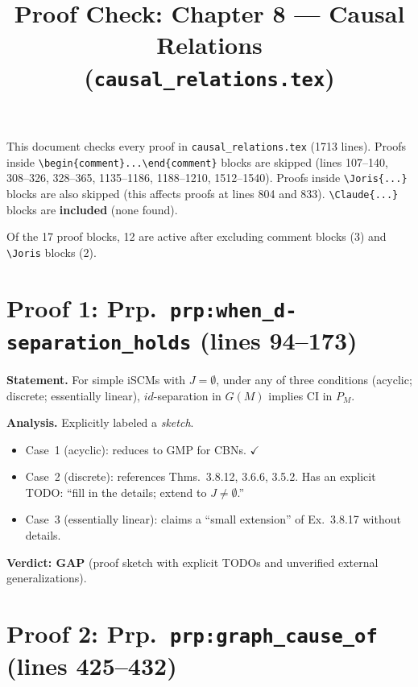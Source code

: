 \documentclass{article}
\title{Proof Check: Chapter 8 --- Causal Relations\\(\texttt{causal\_relations.tex})}
\date{}
\begin{document}
\maketitle

This document checks every proof in \texttt{causal\_relations.tex} (1713 lines).
Proofs inside \verb|\begin{comment}...\end{comment}| blocks are skipped
(lines 107--140, 308--326, 328--365, 1135--1186, 1188--1210, 1512--1540).
Proofs inside \verb|\Joris{...}| blocks are also skipped (this affects
proofs at lines 804 and 833).
\verb|\Claude{...}| blocks are \textbf{included} (none found).

Of the 17 proof blocks, 12 are active after excluding comment blocks (3)
and \verb|\Joris| blocks (2).

\section{Proof 1: Prp.\ \texttt{prp:when\_d-separation\_holds} (lines 94--173)}

\textbf{Statement.} For simple iSCMs with $J=\emptyset$, under any of three
conditions (acyclic; discrete; essentially linear), $id$-separation in $G(M)$
implies CI in $P_M$.

\textbf{Analysis.}
Explicitly labeled a \emph{sketch}.
\begin{itemize}
  \item Case~1 (acyclic): reduces to GMP for CBNs.  $\checkmark$
  \item Case~2 (discrete): references \cite{FM17} Thms.\ 3.8.12, 3.6.6, 3.5.2.
    Has an explicit TODO: ``fill in the details; extend to $J\neq\emptyset$.''
  \item Case~3 (essentially linear): claims a ``small extension'' of
    \cite{FM17} Ex.\ 3.8.17 without details.
\end{itemize}

\textbf{Verdict: GAP} (proof sketch with explicit TODOs and unverified
external generalizations).

\section{Proof 2: Prp.\ \texttt{prp:graph\_cause\_of} (lines 425--432)}
\end{document}
